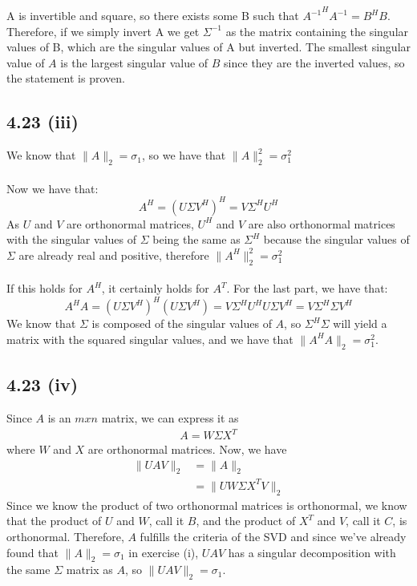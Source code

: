 \documentclass[letterpaper,12pt]{article}
\theoremstyle{definition}
\begin{document}
    A is invertible and square, so there exists some B such that ${A^{-1}}^HA^{-1} = B^HB$.
    Therefore, if we simply invert A we get $\Sigma^{-1}$ as the matrix containing the singular values of B, which are the singular values of A but inverted. The smallest singular value of $A$ is the largest singular value of $B$ since they are the inverted values, so the statement is proven.

\subsection*{4.23 (iii)}


We know that $\|A\|_{2} = \sigma_{1}$, so we have that $\|A\|_{2}^{2} = \sigma_{1}^{2}$ \\ \\
Now we have that:\\
   \[ A^{H} = (U \Sigma V^{H})^{H} = V \Sigma^{H} U^{H} \]
   As $U$ and $V$ are orthonormal matrices, $U^{H}$ and $V$ are also orthonormal matrices with the singular values of $\Sigma$ being the same as $\Sigma^{H}$ because the singular values of $\Sigma$ are already real and positive, therefore $\|A^{H}\|_{2}^{2} = \sigma_{1}^{2}$ \\ \\
   If this holds for $A^H$, it certainly holds for $A^T$.
   For the last part, we have that: \\

   \[ A^{H}A = (U\Sigma V^{H})^{H}(U\Sigma V^{H}) = V\Sigma^{H}U^{H} U\Sigma V^{H} = V\Sigma^{H}\Sigma V^{H} \]
   We know that $\Sigma$ is composed of the singular values of $A$, so $\Sigma^H \Sigma$ will yield a matrix with the squared singular values, and we have that $\|A^{H}A\|_{2} = \sigma_{1}^{2}$.
\subsection*{4.23 (iv)}
Since $A$ is an $mxn$ matrix, we can express it as 
\begin{align*}
    A = W\Sigma X^T
\end{align*}
where $W$ and $X$ are orthonormal matrices. Now, we have
\begin{align*}
    \|UAV\|_2 &= \|A\|_2\\
    &= \|UW\Sigma X^TV\|_2 
\end{align*}
Since we know the product of two orthonormal matrices is orthonormal, we know that the product of $U$ and $W$, call it $B$, and the product of $X^T$ and $V$, call it $C$, is orthonormal. Therefore, $A$ fulfills the criteria of the SVD and since we've already found that $\|A\|_2 = \sigma_1$ in exercise (i), $UAV$ has a singular decomposition with the same $\Sigma$ matrix as $A$, so $\|UAV\|_2 = \sigma_1$.
\end{document}
